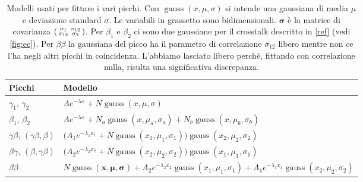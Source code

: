 \newcommand*\gauss{\operatorname{gauss}}
\begin{table}
	\hspace{-2em}
	\begin{tabular}{l|l}
		Picchi & Modello \\
		\hline
		$\gamma_1$, $\gamma_2$
		& $Ae^{-\lambda x} + N\gauss(x, \mu, \sigma)$ \\
		$\beta_1$, $\beta_2$
		& $Ae^{-\lambda x} + N_a\gauss(x, \mu_a, \sigma_a) + N_b\gauss(x, \mu_b, \sigma_b)$ \\
		$\gamma\beta$, $(\gamma\beta,\beta)$
		& $\big(A_1e^{-\lambda_1 x_1} + N\gauss(x_1,\mu_1,\sigma_1)\big)\gauss(x_2,\mu_2,\sigma_2)$ \\
		$\beta\gamma$, $(\beta,\gamma\beta)$
		& $\big(A_2e^{-\lambda_2 x_2} + N\gauss(x_2,\mu_2,\sigma_2)\big)\gauss(x_1,\mu_1,\sigma_1)$ \\
		$\beta\beta$
		& $N\gauss(\mathbf x,\boldsymbol\mu,\boldsymbol\sigma)
		+ A_2e^{-\lambda_2 x_2}\gauss(x_1,\mu_1,\sigma_1)
		+ A_1e^{-\lambda_1 x_1}\gauss(x_2,\mu_2,\sigma_2)$
	\end{tabular}
	\caption[cippalippa]{\label{tab:modelli}
	Modelli usati per fittare i vari picchi.
	Con $\gauss(x,\mu,\sigma)$ si intende una gaussiana di media $\mu$ e deviazione standard $\sigma$.
	Le variabili in grassetto sono bidimensionali.
	$\boldsymbol\sigma$ è la matrice di covarianza
	$\begin{psmallmatrix} \sigma_1 & \sigma_{12} \\ \sigma_{12} & \sigma_2 \end{psmallmatrix}$.
	Per $\beta_1$ e $\beta_2$ ci sono due gaussiane per il crosstalk descritto in \autoref{ref}
	(vedi \autoref{fig:ec}).
	Per $\beta\beta$ la gaussiana del picco ha il parametro di correlazione $\sigma_{12}$ libero
	mentre non ce l'ha negli altri picchi in coincidenza.
	L'abbiamo lasciato libero perché, fittando con correlazione nulla, risulta una significativa discrepanza.}
\end{table}

